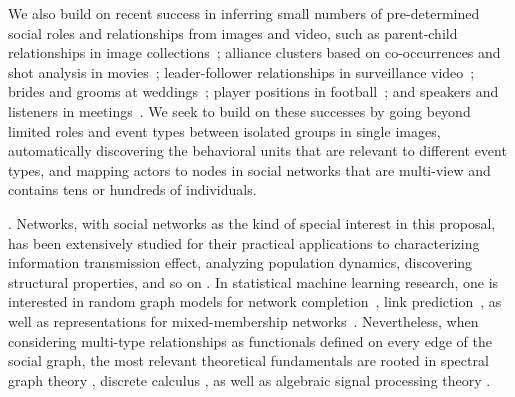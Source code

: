 We also build on recent success in inferring small numbers of pre-determined social roles and relationships from images and video, such as parent-child relationships in image collections~\cite{Gallagher,Wang2010,Murillo2012}; alliance clusters based on co-occurrences and shot analysis in movies~\cite{Ding2010,Ding2011}; leader-follower relationships in surveillance video~\cite{Yu2009,Zhang2011}; brides and grooms at weddings~\cite{FeiFeiRole2013}; player positions in football~\cite{LanSM12}; and speakers and listeners in meetings~\cite{meetingrolerecognition}. We seek to build on these successes by going beyond limited roles and event types between isolated groups in single images, automatically discovering the behavioral units that are relevant to different event types, and mapping actors to nodes in social networks that are multi-view and contains tens or hundreds of individuals.


. Networks, with social networks as the kind of special interest in this proposal, has been extensively studied for their practical applications to characterizing information transmission effect, analyzing population dynamics, discovering structural properties, and so on \cite{Jackson:2008,David:2010}. In statistical machine learning research, one is interested in random graph models for network completion~\cite{Clauset,Guimera,HannekeX09,KimL11}, link prediction~\cite{Goldberg,Liben-Nowell,TaskarWAK03}, as well as representations for mixed-membership networks~\cite{AiroldiBFX08,Kim12}. Nevertheless, when considering multi-type relationships as functionals defined on every edge of the social graph, the most relevant theoretical fundamentals are rooted in spectral graph theory \cite{SpectralChung}, discrete calculus \cite{Grady10}, as well as algebraic signal processing theory \cite{ASP}.

